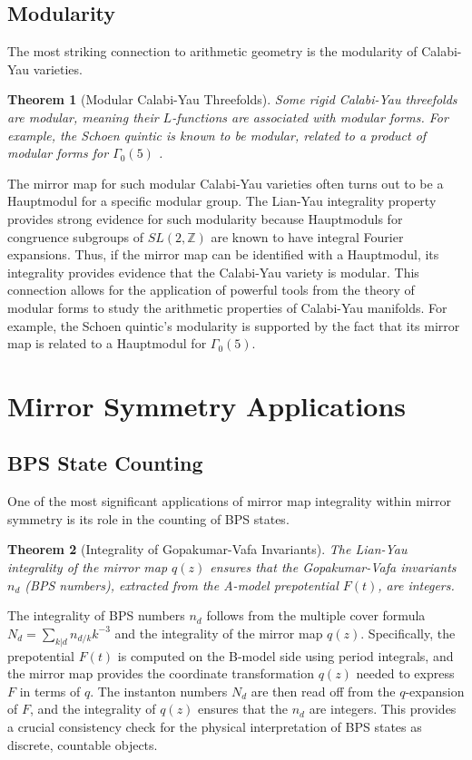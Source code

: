 \documentclass{book}
\newcommand{\qexp}{q} %
\newcommand{\zmod}{z} %
\newcommand{\tmap}{t} %
\newcommand{\Fgen}{F} %
\newcommand{\Nd}{N_d} %
\newcommand{\nd}{n_d} %
\newtheorem{theorem}{Theorem}[section]
\theoremstyle{definition}
\begin{document}
\subsection{Modularity}
The most striking connection to arithmetic geometry is the modularity of Calabi-Yau varieties.
\begin{theorem}[Modular Calabi-Yau Threefolds]
\label{thm:modular_CY3}
Some rigid Calabi-Yau threefolds are modular, meaning their $L$-functions are associated with modular forms. For example, the Schoen quintic is known to be modular, related to a product of modular forms for $\Gamma_0(5)$ \cite{Yui2003, DieulefaitManoharmayum2003}.
\end{theorem}
The mirror map for such modular Calabi-Yau varieties often turns out to be a Hauptmodul for a specific modular group. The Lian-Yau integrality property provides strong evidence for such modularity because Hauptmoduls for congruence subgroups of $SL(2, \mathbb{Z})$ are known to have integral Fourier expansions. Thus, if the mirror map can be identified with a Hauptmodul, its integrality provides evidence that the Calabi-Yau variety is modular. This connection allows for the application of powerful tools from the theory of modular forms to study the arithmetic properties of Calabi-Yau manifolds. For example, the Schoen quintic's modularity is supported by the fact that its mirror map is related to a Hauptmodul for $\Gamma_0(5)$.

\section{Mirror Symmetry Applications}

\subsection{BPS State Counting}
One of the most significant applications of mirror map integrality within mirror symmetry is its role in the counting of BPS states.
\begin{theorem}[Integrality of Gopakumar-Vafa Invariants]
\label{thm:BPS_integrality}
The Lian-Yau integrality of the mirror map $\qexp(\zmod)$ ensures that the Gopakumar-Vafa invariants $\nd$ (BPS numbers), extracted from the A-model prepotential $\Fgen(\tmap)$, are integers.
\end{theorem}
The integrality of BPS numbers $\nd$ follows from the multiple cover formula $\Nd = \sum_{k|d} n_{d/k} k^{-3}$ and the integrality of the mirror map $\qexp(\zmod)$. Specifically, the prepotential $\Fgen(\tmap)$ is computed on the B-model side using period integrals, and the mirror map provides the coordinate transformation $\qexp(\zmod)$ needed to express $\Fgen$ in terms of $\qexp$. The instanton numbers $\Nd$ are then read off from the $\qexp$-expansion of $\Fgen$, and the integrality of $\qexp(\zmod)$ ensures that the $\nd$ are integers. This provides a crucial consistency check for the physical interpretation of BPS states as discrete, countable objects.
\end{document}
